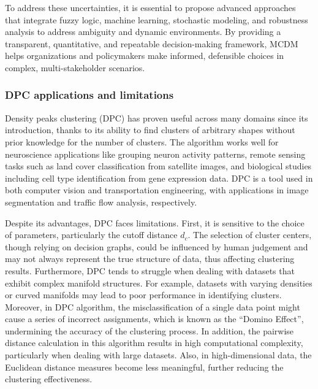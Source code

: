 \documentclass{article}
\begin{document}
To address these uncertainties, it is essential to propose advanced approaches that integrate fuzzy logic, machine learning, stochastic modeling, and robustness analysis to address ambiguity and dynamic environments. By providing a transparent, quantitative, and repeatable decision-making framework, MCDM helps organizations and policymakers make informed, defensible choices in complex, multi-stakeholder scenarios.

\subsubsection{DPC applications and limitations}
Density peaks clustering (DPC) has proven useful across many domains since its introduction, thanks to its ability to find clusters of arbitrary shapes without prior knowledge for the number of clusters. The algorithm works well for neuroscience applications like grouping neuron activity patterns, remote sensing tasks such as land cover classification from satellite images, and biological studies including cell type identification from gene expression data. DPC is a tool used in both computer vision and transportation engineering, with applications in image segmentation and traffic flow analysis, respectively.

Despite its advantages, DPC faces limitations. First, it is sensitive to the choice of parameters, particularly the cutoff distance $d_{c}$. The selection of cluster centers, though relying on decision graphs, could be influenced by human judgement and may not always represent the true structure of data, thus affecting clustering results. Furthermore, DPC tends to struggle when dealing with datasets that exhibit complex manifold structures. For example, datasets with varying densities or curved manifolds may lead to poor performance in identifying clusters. Moreover, in DPC algorithm, the misclassification of a single data point might cause a series of incorrect assignments, which is known as the ``Domino Effect'', undermining the accuracy of the clustering process. In addition, the pairwise distance calculation in this algorithm results in high computational complexity, particularly when dealing with large datasets. Also, in high-dimensional data, the Euclidean distance measures become less meaningful, further reducing the clustering effectiveness.
\end{document}
